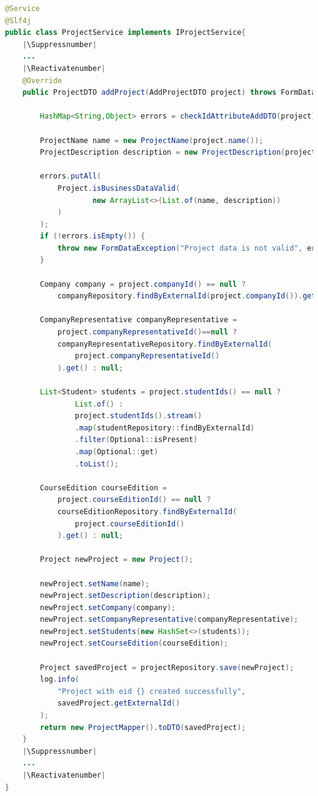 \begin{lstlisting}[language=Java, caption={Implementação do metodo para criação de um novo projeto}, label={lst:method-create-new-project-class-ProjectService}]
@Service
@Slf4j
public class ProjectService implements IProjectService{
    |\Suppressnumber|
    ... 
    |\Reactivatenumber|
    @Override
    public ProjectDTO addProject(AddProjectDTO project) throws FormDataException {

        HashMap<String,Object> errors = checkIdAttributeAddDTO(project);

        ProjectName name = new ProjectName(project.name());
        ProjectDescription description = new ProjectDescription(project.description());

        errors.putAll(
            Project.isBusinessDataValid(
                    new ArrayList<>(List.of(name, description))
            )
        );
        if (!errors.isEmpty()) {
            throw new FormDataException("Project data is not valid", errors);
        }

        Company company = project.companyId() == null ? 
            companyRepository.findByExternalId(project.companyId()).get() : null;

        CompanyRepresentative companyRepresentative =
            project.companyRepresentativeId()==null ? 
            companyRepresentativeRepository.findByExternalId(
                project.companyRepresentativeId()
            ).get() : null;
        
        List<Student> students = project.studentIds() == null ? 
                List.of() : 
                project.studentIds().stream()
                .map(studentRepository::findByExternalId)
                .filter(Optional::isPresent)
                .map(Optional::get)
                .toList();

        CourseEdition courseEdition = 
            project.courseEditionId() == null ? 
            courseEditionRepository.findByExternalId(
                project.courseEditionId()
            ).get() : null;

        Project newProject = new Project();

        newProject.setName(name);
        newProject.setDescription(description);
        newProject.setCompany(company);
        newProject.setCompanyRepresentative(companyRepresentative);
        newProject.setStudents(new HashSet<>(students));
        newProject.setCourseEdition(courseEdition);

        Project savedProject = projectRepository.save(newProject);
        log.info(
            "Project with eid {} created successfully", 
            savedProject.getExternalId()
        );
        return new ProjectMapper().toDTO(savedProject);
    }
    |\Suppressnumber|
    ...
    |\Reactivatenumber|
}

\end{lstlisting}


